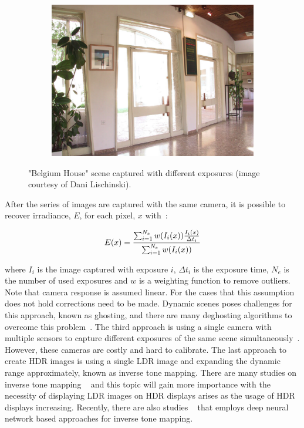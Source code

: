 \begin{figure}
\begin{subfigure}[b]{0.33\textwidth}
    \includegraphics[width=\textwidth]{figures/chapter2/exposure/bh9.jpg}
\end{subfigure}\hfill
\caption{"Belgium House" scene captured with different exposures (image courtesy of Dani Lischinski). }
\label{fig:exposures}
\end{figure}

After the series of images are captured with the same camera, it is possible to recover irradiance, $E$, for each pixel, $x$ with~\cite{banterle2017advanced}:

\begin{equation}
    E(x) = {{\sum^{N_e}_{i=1} w(I_i(x)) {I_i(x) \over \Delta t_i}} \over {\sum^{N_e}_{i=1} w(I_i(x))}} 
\end{equation}

where $I_i$ is the image captured with exposure $i$, $\Delta t_i$ is the exposure time, $N_e$ is the number of used exposures and $w$ is a weighting function to remove outliers. Note that camera response is assumed linear. For the cases that this assumption does not hold corrections need to be made. Dynamic scenes poses challenges for this approach, known as ghosting, and there are many deghosting algorithms to overcome this problem~\cite{Tursun2015_deghosting_survey}. The third approach is using a single camera with multiple sensors to capture different exposures of the same scene simultaneously~\cite{tocci2011versatile,mcguire2007optical}. However, these cameras are costly and hard to calibrate. The last approach to create HDR images is using a single LDR image and expanding the dynamic range approximately, known as inverse tone mapping. There are many studies on inverse tone mapping ~\cite{akyuz2007hdr,masia2009evaluation,wang2007high,huo2014physiological} and this topic will gain more importance with the necessity of displaying LDR images on HDR displays arises as the usage of HDR displays increasing. Recently, there are also studies ~\cite{eilertsen2017hdr,metzler2020deep} that employs deep neural network based approaches for inverse tone mapping. 


